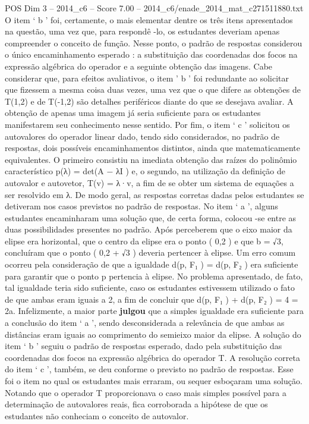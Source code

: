 \begin{textsample}{POS Dim 3 – 2014\_c6 – Score 7.00 – 2014\_c6/enade\_2014\_mat\_c271511880.txt}
O item ‘ b ’ foi, certamente, o mais elementar dentre os três itens apresentados na questão, uma vez que, para respondê -lo, os estudantes deveriam apenas compreender o conceito de função.
Nesse ponto, o padrão de respostas considerou o único encaminhamento esperado : a substituição das coordenadas dos focos na expressão algébrica do operador e a seguinte obtenção das imagens.
Cabe considerar que, para efeitos avaliativos, o item ’ b ’ foi redundante ao solicitar que fizessem a mesma coisa duas vezes, uma vez que o que difere as obtenções de T(1,2) e de T(-1,2) são detalhes periféricos diante do que se desejava avaliar.
A obtenção de apenas uma imagem já seria suficiente para os estudantes manifestarem seu conhecimento nesse sentido.
Por fim, o item ‘ c ’ solicitou os autovalores do operador linear dado, tendo sido considerados, no padrão de respostas, dois possíveis encaminhamentos distintos, ainda que matematicamente equivalentes.
O primeiro consistiu na imediata obtenção das raízes do polinômio característico p(λ) = det(A − λI ) e, o segundo, na utilização da definição de autovalor e autovetor, T(v) = λ·v, a fim de se obter um sistema de equações a ser resolvido em λ.
De modo geral, as respostas corretas dadas pelos estudantes se detiveram nos casos previstos no padrão de respostas.
No item ‘ a ’, alguns estudantes encaminharam uma solução que, de certa forma, colocou -se entre as duas possibilidades presentes no padrão.
Após perceberem que o eixo maior da elipse era horizontal, que o centro da elipse era o ponto ( 0,2 ) e que b = √3, concluíram que o ponto ( 0,2 + √3 ) deveria pertencer à elipse.
Um erro comum ocorreu pela consideração de que a igualdade d(p, F₁ ) = d(p, F₂ ) era suficiente para garantir que o ponto p pertencia à elipse.
No problema apresentado, de fato, tal igualdade teria sido suficiente, caso os estudantes estivessem utilizado o fato de que ambas eram iguais a 2, a fim de concluir que d(p, F₁ ) + d(p, F₂ ) = 4 = 2a.
Infelizmente, a maior parte \textbf{julgou} que a simples igualdade era suficiente para a conclusão do item ‘ a ’, sendo desconsiderada a relevância de que ambas as distâncias eram iguais ao comprimento do semieixo maior da elipse.
A solução do item ‘ b ’ seguiu o padrão de respostas esperado, dado pela substituição das coordenadas dos focos na expressão algébrica do operador T.
A resolução correta do item ‘ c ’, também, se deu conforme o previsto no padrão de respostas.
Esse foi o item no qual os estudantes mais erraram, ou sequer esboçaram uma solução.
Notando que o operador T proporcionava o caso mais simples possível para a determinação de autovalores reais, fica corroborada a hipótese de que os estudantes não conheciam o conceito de autovalor.

\end{textsample}
